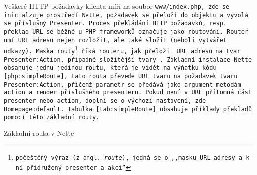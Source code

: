  \label{section:routovani}
Veškeré HTTP požadavky klienta míří na soubor \tt{www/index.php}, zde se inicialzuje prostředí Nette, požadavek se přeloží do objektu  a~vyvolá se příslušný Presenter. Proces překládání HTTP požadavků, resp. překlad URL se běžně u PHP frameworků označuje jako routování. Router umí URL adresu nejen rozložit, ale také složit (neboli vytvářet odkazy). Maska routy\footnote{počeštěný výraz (z angl. \textit{route}), jedná se o ,,masku URL adresy a k ní přidružený presenter a~akci''\cite{NetteRoutovani}} říká routeru, jak přeložit URL adresu na tvar \texttt{Presenter:Action}, případně složitější tvary \cite{NetteRoutovani}. Základní instalace Nette obsahuje jednu jedinou routu, která je vidět na výňatku kódu \ref{php:simpleRoute}, tato routa převede URL tvaru  na~požadavek tvaru \texttt{Presenter:Action}, přičemž parametr  se předává jako argument metodám action a render příslušného presenteru. Pokud není v URL přítomná část presenter nebo action, doplní se o výchozí nastavení, zde \texttt{Homepage:default}. Tabulka \ref{tab:simpleRoute} obsahuje příklady překladů pomocí této základní routy.
\clearpage
\begin{listing}[ht]
\caption{Základní routa v Nette}
\label{php:simpleRoute}
\end{listing}




